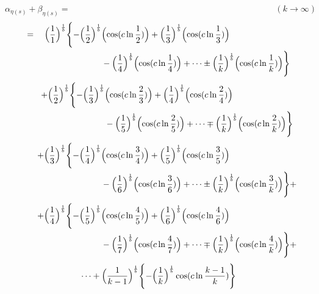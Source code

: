 \documentclass{amsart}
\begin{document}
	\[ \alpha_{\eta(s)} + \beta_{\eta(s)} = \qquad\qquad\qquad\qquad\qquad\qquad\qquad\qquad\qquad\qquad\qquad\qquad (k \to \infty) \]
	\[
	\begin{aligned}
		= \quad \Bigl( \frac{1}{1} \Bigr)^\frac1b \Biggl\{ -\Bigl( \frac{1}{2} \Bigr)^\frac1b & \Bigl( \cos(c \ln \frac{1}{2}) \Bigr) + \Bigl( \frac{1}{3} \Bigr)^\frac1b \Bigl( \cos(c \ln \frac{1}{3}) \Bigr) \\
		& -\Bigl( \frac{1}{4} \Bigr)^\frac1b \Bigl( \cos(c \ln \frac{1}{4}) \Bigr) + \dots \pm \Bigl( \frac{1}{k} \Bigr)^\frac1b \Bigl( \cos(c \ln \frac{1}{k}) \Bigr) \Biggr\} 
	\end{aligned}
	\]
	\[
	\begin{aligned}
		\quad\quad +\Bigl( \frac{1}{2} \Bigr)^\frac1b \Biggl\{ -\Bigl( \frac{1}{3} \Bigr)^\frac1b & \Bigl( \cos(c \ln \frac{2}{3}) \Bigr) + \Bigl( \frac{1}{4} \Bigr)^\frac1b \Bigl( \cos(c \ln \frac{2}{4}) \Bigr) \\
		& -\Bigl( \frac{1}{5} \Bigr)^\frac1b \Bigl( \cos(c \ln \frac{2}{5}) \Bigr) + \dots \mp \Bigl( \frac{1}{k} \Bigr)^\frac1b \Bigl( \cos(c \ln \frac{2}{k}) \Bigr) \Biggr\}
	\end{aligned}
	\]
	\[
	\begin{aligned}
		\quad\quad +\Bigl( \frac{1}{3} \Bigr)^\frac1b \Biggl\{ -\Bigl( \frac{1}{4} \Bigr)^\frac1b & \Bigl( \cos(c \ln \frac{3}{4}) \Bigr) + \Bigl( \frac{1}{5} \Bigr)^\frac1b \Bigl( \cos(c \ln \frac{3}{5}) \Bigr) \\
		& -\Bigl( \frac{1}{6} \Bigr)^\frac1b \Bigl( \cos(c \ln \frac{3}{6}) \Bigr) + \dots \pm \Bigl( \frac{1}{k} \Bigr)^\frac1b \Bigl( \cos(c \ln \frac{3}{k}) \Bigr) \Biggr\} + 
	\end{aligned}
	\]
	\[
	\begin{aligned}
		\quad\quad +\Bigl( \frac{1}{4} \Bigr)^\frac1b \Biggl\{ -\Bigl( \frac{1}{5} \Bigr)^\frac1b & \Bigl( \cos(c \ln \frac{4}{5}) \Bigr) + \Bigl( \frac{1}{6} \Bigr)^\frac1b \Bigl( \cos(c \ln \frac{4}{6}) \Bigr) \\
		& -\Bigl( \frac{1}{7} \Bigr)^\frac1b \Bigl( \cos(c \ln \frac{4}{7}) \Bigr) + \dots \mp \Bigl( \frac{1}{k} \Bigr)^\frac1b \Bigl( \cos(c \ln \frac{4}{k}) \Bigr) \Biggr\} + 
	\end{aligned}
	\]
	\[ \dots + \Bigl( \frac{1}{k-1} \Bigr)^\frac1b \Biggl\{ -\Bigl( \frac{1}{k} \Bigr)^\frac1b \cos(c \ln \frac{k-1}{k}) \Biggr\} \]
	
	
\end{document}
